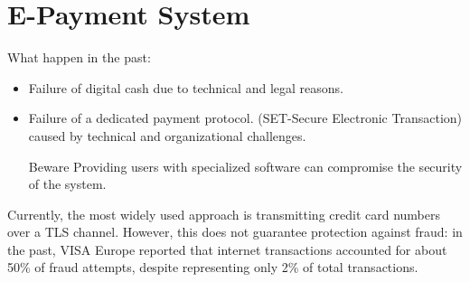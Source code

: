 \noindent{\color{gray!50}\rule{\textwidth}{0.5pt}}
\section{E-Payment System}
What happen in the past:
\begin{itemize}
    \item Failure of digital cash due to technical and legal reasons.
    \item Failure of a dedicated payment protocol. (SET-Secure Electronic Transaction) caused by technical and organizational challenges.
    \begin{quotebox-red}{Beware}
    Providing users with specialized software can compromise the security of the system. 
    \end{quotebox-red}
\end{itemize}
Currently, the most widely used approach is transmitting credit card numbers over a TLS channel. However, this does not guarantee protection against fraud: in the past, VISA Europe reported that internet transactions accounted for about 50\% of fraud attempts, despite representing only 2\% of total transactions.

\newpage

